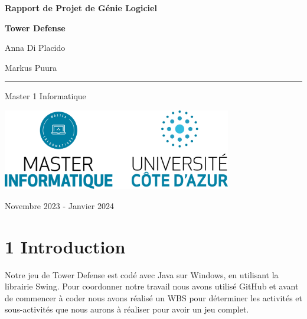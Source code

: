 \documentclass{report}
\begin{document}
\begin{titlepage}
	\begin{center}
	{\Huge\bfseries Rapport de Projet de Génie Logiciel\par}
	\vspace{1cm}
	{\huge\bfseries Tower Defense\par}
	\vspace{0.5cm}
	{\LARGE Anna Di Placido \par}
	\vspace{0.3cm}
	{\LARGE Markus Puura \par}
	
	\rule{12cm}{0.4pt} \newline
	\vspace{0.5cm}
	{\Large Master 1 Informatique\par}
	
	
	
	
	\vspace{2cm}
	\includegraphics[width = 100mm]{logo-colonne-uca-couleur-master.png}
	\vfill
	{\large Novembre 2023 - Janvier 2024\par}
	\end{center}
\end{titlepage}


\newpage

\section*{1 Introduction}

Notre jeu de Tower Defense est codé avec Java sur Windows, en utilisant la librairie Swing. Pour coordonner notre travail nous avons utilisé GitHub et avant de commencer à coder nous avons réalisé un WBS pour déterminer les activités et sous-activités que nous aurons à réaliser pour avoir un jeu complet.
\end{document}
